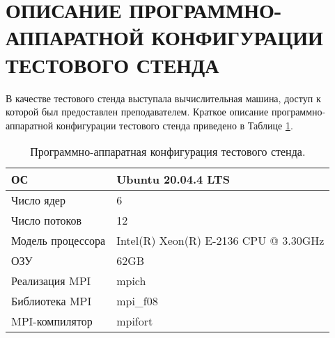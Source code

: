 \section{ОПИСАНИЕ ПРОГРАММНО-АППАРАТНОЙ КОНФИГУРАЦИИ ТЕСТОВОГО СТЕНДА}

В качестве тестового стенда выступала вычислительная машина, доступ к которой был предоставлен преподавателем. Краткое описание программно-аппаратной конфигурации тестового стенда приведено в Таблице \ref{tab:1}.
\begin{table}[!ht]
    \centering
    \begin{tabular}{|l|l|}
    \hline
        ОС & Ubuntu 20.04.4 LTS \\ \hline
        Число ядер & 6 \\ \hline
        Число потоков & 12 \\ \hline
        Модель процессора & Intel(R) Xeon(R) E-2136 CPU @ 3.30GHz \\ \hline
        ОЗУ & 62GB \\ \hline
        Реализация MPI  & mpich \\ \hline
        Библиотека MPI & mpi\_f08 \\ \hline
        MPI-компилятор & mpifort \\ \hline
    \end{tabular}
    \caption{Программно-аппаратная конфигурация тестового стенда.}
    \label{tab:1}
\end{table}